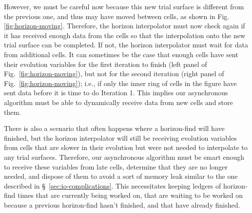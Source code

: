 \begin{bibunit}[unsrtnat]
However, we must be careful now because this new trial surface is different from
the previous one, and thus may have moved between cells, as shown in Fig.~
\ref{fig:horizon-moving}. Therefore, the horizon interpolator must now check
again if it has received enough data from the cells so that the interpolation
onto the new trial surface can be completed. If not, the horizon interpolator
must wait for data from additional cells. It can sometimes be the case that
enough cells have sent their evolution variables for the first iteration to
finish (left panel of Fig.~\ref{fig:horizon-moving}), but not for the second
iteration (right panel of Fig.~\ref{fig:horizon-moving}); i.e., if only the
inner ring of cells in the figure have sent data before it is time to do
Iteration 1. This implies our asynchronous algorithm must be able to dynamically
receive data from new cells and store them.

There is also a scenario that often happens where a horizon-find will have
finished, but the horizon interpolator will still be receiving evolution
variables from cells that are slower in their evolution but were not needed to
interpolate to any trial surfaces. Therefore, our asynchronous algorithm must be
smart enough to receive these variables from late cells, determine that they are
no longer needed, and dispose of them to avoid a sort of memory leak similar to
the one described in \S~\ref{sec:io-complications}. This necessitates keeping
ledgers of horizon-find times that are currently being worked on, that are
waiting to be worked on because a previous horizon-find hasn't finished, and
that have already finished.


\end{bibunit}
